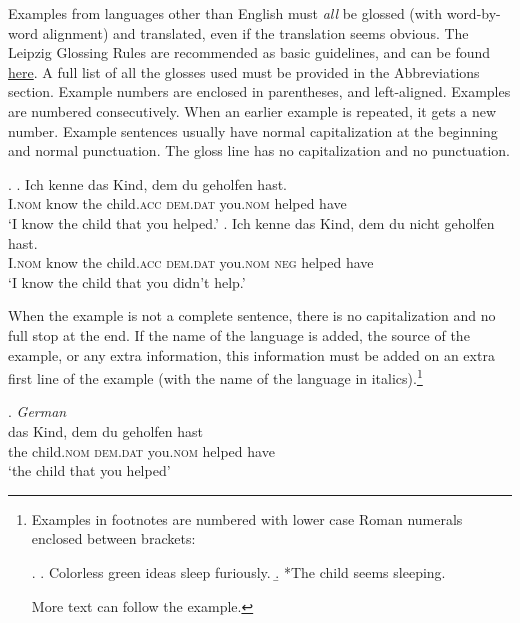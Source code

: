 \documentclass[charis,linguex]{glossa}
\begin{document}
Examples from languages other than English must \emph{all} be glossed (with word-by-word alignment) and translated, even if the translation seems obvious. The Leipzig Glossing Rules are recommended as basic guidelines, and can be found \href{http://www.eva.mpg.de/lingua/resources/glossing-rules.php}{here}. A full list of all the glosses used must be provided in the Abbreviations section. Example numbers are enclosed in parentheses, and left-aligned. Examples are numbered consecutively. When an earlier example is repeated, it gets a new number. Example sentences usually have normal capitalization at the beginning and normal punctuation. The gloss line has no capitalization and no punctuation.

\ex. \ag. Ich   kenne das Kind, dem du geholfen hast.\\
I.\textsc{nom} know the child.\textsc{acc} \textsc{dem.dat} you.\textsc{nom} helped have\\
\glt `I know the child that you helped.'
\bg. Ich kenne das Kind, dem du nicht geholfen hast. \\
I.\textsc{nom} know  the child.\textsc{acc} \textsc{dem.dat} you.\textsc{nom} \textsc{neg} helped   have\\
\glt `I know the child that you didn’t help.’

When the example is not a complete sentence, there is no capitalization and no full stop at the end. If the name of the language is added, the source of the example, or any extra information, this information must be added on an extra first line of the example (with the name of the language in italics).\footnote{Examples in footnotes are numbered with lower case Roman numerals enclosed between brackets:

\ex.
\a. Colorless green ideas sleep furiously.
\b. *The child seems sleeping.

More text can follow the example.}

\ex. \textit{German} \citep{coetsem:2000}\\ %
\gll das Kind, dem du geholfen hast\\  %
the child.\textsc{nom} \textsc{dem.dat} you.\textsc{nom}  helped have\\ %
\glt `the child that you helped' %
\end{document}
